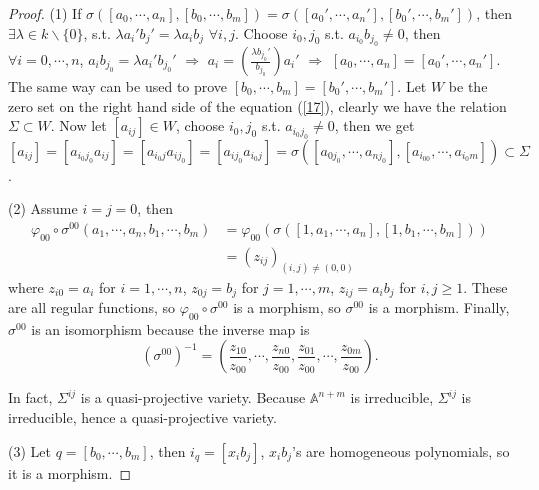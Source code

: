 \begin{proof}
	(1) If $ \sigma( [a_0,\cdots,a_n],[b_0,\cdots,b_m] )=\sigma( [ {a_0}',\cdots,{a_n}' ],[ {b_0}',\cdots,{b_m}' ] ) $, then $ \exists \lambda\in k\backslash \{ 0 \} $, s.t. $ \lambda a_i'b_j'=\lambda a_ib_j $ $ \forall i,j $. Choose $ i_0,j_0 $ s.t. $ a_{i_0}b_{j_0}\neq 0 $, then $ \forall i=0,\cdots,n $, $ a_ib_{j_0}=\lambda a_i'b_{j_0}' $ $ \Rightarrow $ $ a_i=\left(\frac{\lambda b_{j_0}'}{b_{j_0}}\right)a_i' $ $ \Rightarrow $ $ [a_0,\cdots,a_n]=[{a_0}',\cdots,{a_n}'] $. The same way can be used to prove $ [b_0,\cdots,b_m]=[{b_0}',\cdots,{b_m}'] $. Let $ W $ be the zero set on the right hand side of the equation (\ref{17}), clearly we have the relation $ \Sigma\subset W $. Now let $ [a_{ij}]\in W $, choose $ i_0,j_0 $ s.t. $ a_{i_0j_0}\neq 0 $, then we get $ [a_{ij}]=[a_{i_0j_0}a_{ij}]=[a_{i_0j}a_{ij_0}]=[a_{ij_0}a_{i_0j}]=\sigma([a_{0j_0},\cdots,a_{nj_0}],[a_{i_00},\cdots,a_{i_0m}])\subset \Sigma $.

	(2) Assume $ i=j=0 $, then
	$$\begin{array}{cc}
			\varphi_{00}\circ\sigma^{00}(a_1,\cdots,a_n,b_1,\cdots,b_m) & =\varphi_{00}(\sigma([1,a_1,\cdots,a_n],[1,b_1,\cdots,b_m])) \\
			                                                            & =(z_{ij})_{(i,j)\neq(0,0)}
		\end{array}$$
	where $ z_{i0}=a_i $ for $ i=1,\cdots,n $, $ z_{0j}=b_j $ for $ j=1,\cdots,m $, $ z_{ij}=a_ib_j $ for $ i,j\geq 1 $. These are all regular functions, so  $ \varphi_{00}\circ \sigma^{00} $ is a morphism, so $ \sigma^{00} $ is a morphism. Finally, $ \sigma^{00} $ is an isomorphism because the inverse map is
	$$
		(\sigma^{00})^{-1}=\left(\frac{z_{10}}{z_{00}},\cdots,\frac{z_{n0}}{z_{00}},\frac{z_{01}}{z_{00}},\cdots,\frac{z_{0m}}{z_{00}}\right).
	$$
	\begin{remark}
		In fact,  $ \Sigma^{ij} $ is a quasi-projective  variety. Because $ \mathbb{A}^{n+m} $ is irreducible, $ \Sigma^{ij} $ is irreducible, hence a quasi-projective variety.
	\end{remark}

	(3) Let $ q=[b_0,\cdots,b_m] $, then $ i_{q}=[x_ib_j] $, $ x_ib_j $'s are homogeneous polynomials, so  it is a morphism.


\end{proof}
